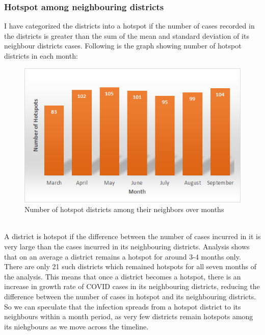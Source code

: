 \documentclass{article}
\begin{document}
\subsubsection{Hotspot among neighbouring districts}
I have categorized the districts into a hotspot if the number of cases recorded in the districts is greater than the sum of the mean and standard deviation of its neighbour districts cases. Following is the graph showing number of hotspot districts in each month:
\begin{figure}[h]
    \centering
    \includegraphics{images/neighbour-month-hotspots.png}
    \caption{Number of hotspot districts among their neighbors over months}
\end{figure}
\\
A district is hotspot if the difference between the number of cases incurred in it is very large than the cases incurred in its neighbouring districts. Analysis shows that on an average a district remains a hotspot for around 3-4 months only. There are only 21 such districts which remained hotspots for all seven months of the analysis. This means that once a district becomes a hotspot, there is an increase in growth rate of COVID cases in its neighbouring districts, reducing the difference between the number of cases in hotspot and its neighbouring districts.\\
So we can speculate that the infection spreads from a hotspot district to its neighbours within a month period, as very few districts remain hotspots among its niehgbours as we move across the timeline.
\end{document}
